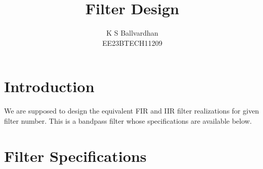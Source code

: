 \documentclass{article}
\begin{document}
	
	\title{ \textbf{Filter Design}}
	
	\author{K S Ballvardhan\\EE23BTECH11209}
	\date{}
	
	\maketitle
	\section{Introduction}
	We are supposed to design the equivalent FIR and IIR filter realizations for given filter number.  
	This is a bandpass filter whose specifications are available below.
	
	\section{Filter Specifications}
\end{document}
